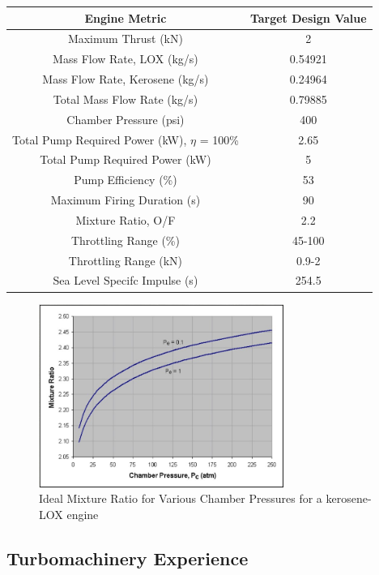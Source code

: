 \documentclass[12pt, letterpaper]{article}
\begin{document}
\begin{tabular}{|c|c|}

\hline

Engine Metric & Target Design Value \\

\hline

Maximum Thrust (kN) & 2 \\
Mass Flow Rate, LOX (kg/s) & 0.54921 \\
Mass Flow Rate, Kerosene (kg/s) & 0.24964 \\
Total Mass Flow Rate (kg/s) & 0.79885 \\
Chamber Pressure (psi) & 400 \\
Total Pump Required Power  (kW), $\eta$ = 100\% & 2.65 \\
Total Pump Required Power (kW) & 5 \\
Pump Efficiency (\%) & 53 \\
Maximum Firing Duration (s) & 90 \\
Mixture Ratio, O/F & 2.2 \\
Throttling Range (\%) & 45-100 \\
Throttling Range (kN)& 0.9-2 \\
Sea Level Specifc Impulse (s) & 254.5 \\

\hline

\end{tabular}

\begin{figure}[H]
    \centering
    \includegraphics[width=8cm]{Plots and Graphs/Ideal_Mixture_Ratio.jpg}
    \caption{Ideal Mixture Ratio for Various Chamber Pressures for a kerosene-LOX engine}
\end{figure}


\subsection{Turbomachinery Experience}
\end{document}

